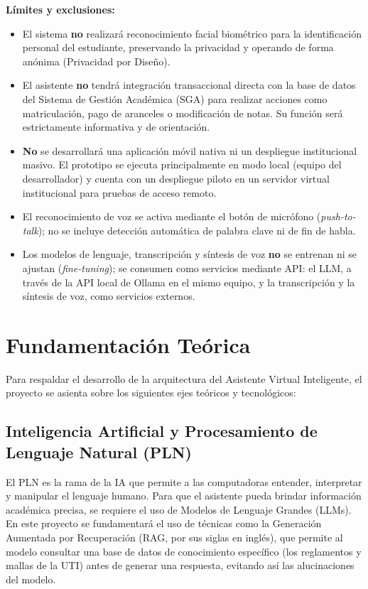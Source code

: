 \textbf{Límites y exclusiones:}
\begin{itemize}
    \item El sistema \textbf{no} realizará reconocimiento facial biométrico para la identificación personal del estudiante, preservando la privacidad y operando de forma anónima (Privacidad por Diseño).
    \item El asistente \textbf{no} tendrá integración transaccional directa con la base de datos del Sistema de Gestión Académica (SGA) para realizar acciones como matriculación, pago de aranceles o modificación de notas. Su función será estrictamente informativa y de orientación.
    \item \textbf{No} se desarrollará una aplicación móvil nativa ni un despliegue institucional masivo. El prototipo se ejecuta principalmente en modo local (equipo del desarrollador) y cuenta con un despliegue piloto en un servidor virtual institucional para pruebas de acceso remoto.
    \item El reconocimiento de voz se activa mediante el botón de micrófono (\textit{push-to-talk}); no se incluye detección automática de palabra clave ni de fin de habla.
    \item Los modelos de lenguaje, transcripción y síntesis de voz \textbf{no} se entrenan ni se ajustan (\textit{fine-tuning}); se consumen como servicios mediante API: el LLM, a través de la API local de Ollama en el mismo equipo, y la transcripción y la síntesis de voz, como servicios externos.
\end{itemize}

\section{Fundamentación Teórica}

Para respaldar el desarrollo de la arquitectura del Asistente Virtual Inteligente, el proyecto se asienta sobre los siguientes ejes teóricos y tecnológicos:

\subsection{Inteligencia Artificial y Procesamiento de Lenguaje Natural (PLN)}
El PLN es la rama de la IA que permite a las computadoras entender, interpretar y manipular el lenguaje humano. Para que el asistente pueda brindar información académica precisa, se requiere el uso de Modelos de Lenguaje Grandes (LLMs). En este proyecto se fundamentará el uso de técnicas como la Generación Aumentada por Recuperación (RAG, por sus siglas en inglés), que permite al modelo consultar una base de datos de conocimiento específico (los reglamentos y mallas de la UTI) antes de generar una respuesta, evitando así las alucinaciones del modelo.

